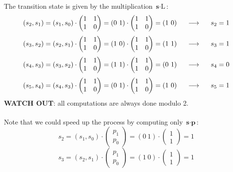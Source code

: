 The transition state is given by the multiplication $\textbf{s}\cdot\text{L}$:
$$
    (s_2,s_1)=(s_1, s_0)\cdot
    \begin{pmatrix}
        1 & 1\\
        1 & 0
    \end{pmatrix}
    =(0\ 1)\cdot
    \begin{pmatrix}
        1 & 1\\
        1 & 0
    \end{pmatrix}
    =(1\ 0)
    \hspace{0.5cm}\longrightarrow\hspace{0.5cm} s_2=1
$$
$$
    (s_3,s_2)=(s_2, s_1)\cdot
    \begin{pmatrix}
        1 & 1\\
        1 & 0
    \end{pmatrix}
    =(1\ 0)\cdot
    \begin{pmatrix}
        1 & 1\\
        1 & 0
    \end{pmatrix}
    =(1\ 1)
    \hspace{0.5cm}\longrightarrow\hspace{0.5cm} s_3=1
$$
$$
    (s_4,s_3)=(s_3, s_2)\cdot
    \begin{pmatrix}
        1 & 1\\
        1 & 0
    \end{pmatrix}
    =(1\ 1)\cdot
    \begin{pmatrix}
        1 & 1\\
        1 & 0
    \end{pmatrix}
    =(0\ 1)
    \hspace{0.5cm}\longrightarrow\hspace{0.5cm} s_4=0
$$
$$
    (s_5,s_4)=(s_4, s_3)\cdot
    \begin{pmatrix}
        1 & 1\\
        1 & 0
    \end{pmatrix}
    =(0\ 1)\cdot
    \begin{pmatrix}
        1 & 1\\
        1 & 0
    \end{pmatrix}
    =(1\ 0)
    \hspace{0.5cm}\longrightarrow\hspace{0.5cm} s_5=1
$$
\textbf{WATCH OUT}: all computations are always done modulo 2.\\\\
Note that we could speed up the process by computing only $\textbf{s}\cdot\textbf{p}$:
$$
    s_2=(s_1, s_0)\cdot
    \begin{pmatrix}
        p_1\\
        p_0
    \end{pmatrix}=
    (0\ 1)\cdot
    \begin{pmatrix}
        1\\
        1
    \end{pmatrix}=1
$$
$$
    s_3=(s_2, s_1)\cdot
    \begin{pmatrix}
        p_1\\
        p_0
    \end{pmatrix}=
    (1\ 0)\cdot
    \begin{pmatrix}
        1\\
        1
    \end{pmatrix}=1
$$
